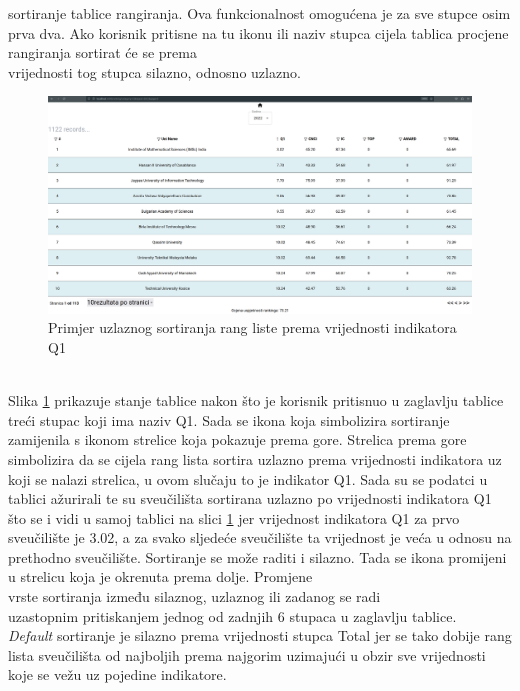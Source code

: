 \documentclass[times, utf8, zavrsni]{fer}
\begin{document}
sortiranje tablice rangiranja. Ova funkcionalnost omogućena je za sve stupce osim prva dva. Ako korisnik pritisne na tu ikonu ili naziv stupca cijela tablica 
procjene rangiranja sortirat će se prema \\vrijednosti tog stupca silazno, odnosno uzlazno. 
\begin{figure}[htb]
    \hspace*{-2cm}  
       \includegraphics[scale=0.21]{sort1.png} 
       \caption{Primjer uzlaznog sortiranja rang liste prema vrijednosti indikatora Q1}
       \label{fig:sort1}
       \end{figure}
\\Slika \ref{fig:sort1} prikazuje stanje tablice nakon što je korisnik pritisnuo u zaglavlju tablice treći stupac koji ima naziv Q1. Sada se ikona koja simbolizira
sortiranje zamijenila s ikonom strelice koja pokazuje prema gore. Strelica prema gore simbolizira da se cijela rang lista
sortira uzlazno prema vrijednosti indikatora uz koji se nalazi strelica, u ovom slučaju to je indikator Q1. Sada su se podatci u tablici 
ažurirali te su sveučilišta sortirana uzlazno po vrijednosti indikatora Q1 što se i vidi u samoj tablici na slici \ref{fig:sort1} jer vrijednost indikatora Q1 za prvo 
sveučilište je 3.02, a za svako sljedeće sveučilište ta vrijednost je veća u odnosu na prethodno sveučilište. Sortiranje se može raditi i silazno. Tada se ikona promijeni
u strelicu koja je okrenuta prema dolje. Promjene \\vrste sortiranja između silaznog, uzlaznog ili zadanog  se radi \\uzastopnim pritiskanjem 
jednog od zadnjih 6 stupaca u zaglavlju tablice.
\\\emph{Default} sortiranje je silazno prema vrijednosti stupca Total jer se tako dobije rang lista sveučilišta od najboljih prema najgorim uzimajući u obzir sve 
vrijednosti koje se vežu uz pojedine indikatore.
\end{document}
